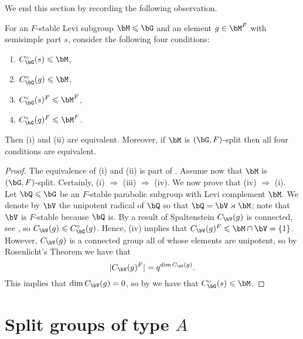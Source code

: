 \documentclass[eqthmnum,nocolour,skinny]{jt-calcs}
\begin{document}
We end this section by recording the following observation.

\begin{lem}\label{centralisers}
For an $F$-stable Levi subgroup $\bM \leqslant \bG$ and an element $g \in \bM^F$ with semisimple part $s$, consider the following four conditions:
\begin{enumerate}[label=\textnormal{(\roman*)}]
	\item $C_{\bG}^{\circ}(s) \leqslant \bM$,
	\item $C_{\bG}^\circ(g) \leqslant \bM$,
	\item $C_{\bG}^{\circ}(s)^F \leqslant \bM^F$,
	\item $C_{\bG}^{\circ}(g)^F \leqslant \bM^F$.
\end{enumerate}
Then \textnormal{(i)} and \textnormal{(ii)} are equivalent. Moreover, if $\bM$ is $(\bG,F)$-split then all four conditions are equivalent.
\end{lem}

\begin{proof}
The equivalence of (i) and (ii) is part of \cite[Lem.~1.2]{bonnafe:2004:actions-of-rel-Weyl-grps-I}.
Assume now that $\bM$ is $(\bG,F)$-split. Certainly, (i) $\Rightarrow$ (iii) $\Rightarrow$ (iv). We now prove that (iv) $\Rightarrow$ (i). Let $\bQ \leqslant \bG$ be an $F$-stable parabolic subgroup with Levi complement $\bM$. We denote by $\bV$ the unipotent radical of $\bQ$ so that $\bQ = \bV \rtimes \bM$; note that $\bV$ is $F$-stable because $\bQ$ is. By a result of Spaltenstein $C_{\bV}(g)$ is connected, see \cite[1.2]{bonnafe:2004:actions-of-rel-Weyl-grps-I}, so $C_{\bV}(g) \leqslant C_{\bG}^{\circ}(g)$. Hence, 
(iv) implies that $C_{\bV}(g)^F \leqslant \bM \cap \bV = \{1\}$. However, $C_{\bV}(g)$ is a connected group all of whose elements are unipotent, so by Rosenlicht's Theorem we have that
\begin{equation*}
|C_{\bV}(g)^F| = q^{\dim C_{\bV}(g)}.
\end{equation*}
This implies that $\dim C_{\bV}(g) = 0$, so by \cite[1.3]{bonnafe:2004:actions-of-rel-Weyl-grps-I} we have that 
$C_{\bG}^{\circ}(s) \leqslant \bM$.
\end{proof}

\section{\texorpdfstring{Split groups of type $A$}{Split groups of type A}}\label{sec:type-A}
\end{document}
